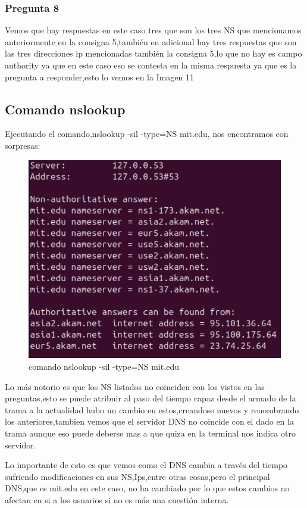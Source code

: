\documentclass{article}
\begin{document}
\subsubsection{Pregunta 8}
Vemos que hay respuestas en este caso tres que son los tres NS que mencionamos anteriormente en la consigna 5,también en adicional hay tres respuestas que son las tres direcciones ip mencionadas también la consigna 5,lo que no hay es campo authority ya que en este caso eso se contesta en la misma respuesta ya que es la pregunta a responder,esto lo vemos en la Imagen 11

\newpage
\subsection{Comando nslookup}

Ejecutando el comando,nslookup -sil -type=NS mit.edu, nos encontramos con sorpresas:

\begin{figure}[h]
    \centering
    \includegraphics[width=0.5\linewidth]{Fotos/nslookup.png}
    \caption{comando nslookup -sil -type=NS mit.edu}
\end{figure}

Lo más notorio es que los NS listados no coinciden con los vistos en las preguntas,esto se puede atribuir al paso del tiempo capaz desde el armado de la trama a la actualidad hubo un cambio en estos,creandose nuevos y renombrando los anteriores,tambien vemos que el servidor DNS no coincide con el dado en la trama aunque eso puede deberse mas a que quiza en la terminal nos indica otro servidor.

Lo importante de esto es que vemos como el DNS cambia a través del tiempo sufriendo modificaciones en sus NS,Ips,entre otras cosas,pero el principal DNS,que es mit.edu en este caso, no ha cambiado por lo que estos cambios no afectan en si a los usuarios si no es más una cuestión interna.
\end{document}
